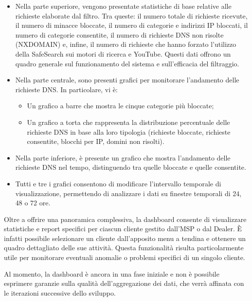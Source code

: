 \begin{itemize}
  \item Nella parte superiore, vengono presentate statistiche di base relative alle richieste elaborate dal filtro. Tra queste: il numero totale di richieste ricevute, il numero di minacce bloccate, il numero di categorie e indirizzi IP bloccati, il numero di categorie consentite, il numero di richieste DNS non risolte (NXDOMAIN) e, infine, il numero di richieste che hanno forzato l’utilizzo della SafeSearch sui motori di ricerca e YouTube. Questi dati offrono un quadro generale sul funzionamento del sistema e sull'efficacia del filtraggio.

  \item Nella parte centrale, sono presenti grafici per monitorare l’andamento delle richieste DNS. In particolare, vi è:
    \begin{itemize}
      \item Un grafico a barre che mostra le cinque categorie più bloccate;
      \item Un grafico a torta che rappresenta la distribuzione percentuale delle richieste DNS in base alla loro tipologia (richieste bloccate, richieste consentite, blocchi per IP, domini non risolti).
    \end{itemize}

  \item Nella parte inferiore, è presente un grafico che mostra l’andamento delle richieste DNS nel tempo, distinguendo tra quelle bloccate e quelle consentite.

  \item Tutti e tre i grafici consentono di modificare l'intervallo temporale di visualizzazione, permettendo di analizzare i dati su finestre temporali di 24, 48 o 72 ore.
\end{itemize}
%
Oltre a offrire una panoramica complessiva, la dashboard consente di visualizzare statistiche e report specifici per ciascun cliente gestito dall’MSP o dal Dealer. È infatti possibile selezionare un cliente dall'apposito menu a tendina e ottenere un quadro dettagliato delle sue attività. Questa funzionalità risulta particolarmente utile per monitorare eventuali anomalie o problemi specifici di un singolo cliente.

Al momento, la dashboard è ancora in una fase iniziale e non è possibile esprimere garanzie sulla qualità dell'aggregazione dei dati, che verrà affinata con le iterazioni successive dello sviluppo.

